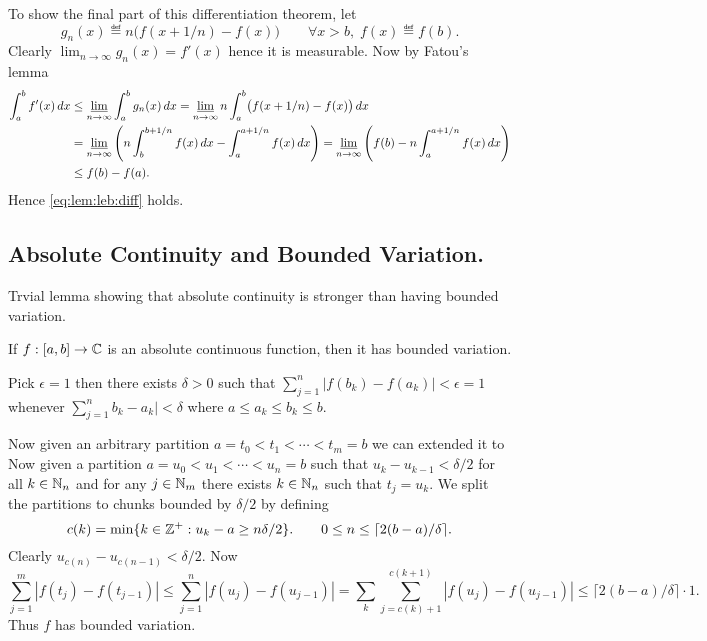 \begin{thmproof}
To show the final part of this differentiation theorem, let 
\begin{equation*}
g_n(x) \eqdef n\bigl(f(x+1/n) - f(x)\bigr) 
                        \qquad \forall x>b,\; f(x)\eqdef f(b).
\end{equation*}
Clearly \(\lim_{n\to\infty} g_n(x) = f'(x)\) hence it is measurable.
Now by Fatou's lemma
\begin{align*}
\int_a^b f'(x)\,dx
&\leq \varliminf_{n\to\infty} \int_a^b g_n(x)\,dx  
= \varliminf_{n\to\infty} n \int_a^b \bigl(f(x+1/n) - f(x)\bigr) \,dx  \\
&= \varliminf_{n\to\infty} 
   \left(n \int_b^{b+1/n} f(x)\,dx  - \int_a^{a+1/n} f(x)\,dx  \right)
 = \varliminf_{n\to\infty} 
   \left(f(b)  - n\int_a^{a+1/n} f(x)\,dx  \right) \\
& \leq f(b) - f(a).
\end{align*}
Hence \eqref{eq:lem:leb:diff} holds.
\end{thmproof}



\subsection{Absolute Continuity and Bounded Variation.}

Trvial lemma showing that absolute continuity is
stronger than having bounded variation.

\begin{llem}
If \(f:[a,b]\to\mathbb{C}\) is an absolute continuous function,
then it has bounded variation.
\end{llem}
\begin{thmproof}
Pick \(\epsilon=1\) then there exists \(\delta>0\)
such that 
\(\sum_{j=1}^n |f(b_k) - f(a_k)| < \epsilon=1\)
whenever
\(\sum_{j=1}^n b_k - a_k| < \delta\)
where \(a \leq a_k \leq b_k \leq b\).

Now given an arbitrary partition \(a = t_0 < t_1 < \cdots < t_m = b\)
we can extended it to 
Now given a partition \(a = u_0 < u_1 < \cdots < u_n = b\)
such that 
\(u_k - u_{k-1} < \delta/2\) for all \(k\in\mathbb{N}_n\) and 
for any \(j\in\mathbb{N}_m\) there exists \(k\in\mathbb{N}_n\) 
such that \(t_j = u_k\).
We split the partitions to chunks bounded by \(\delta/2\) by defining
\begin{equation*}
c(k) = \min \{k\in\mathbb{Z}^+: u_k - a \geq n\delta/2\}.
\qquad 0\leq n \leq \lceil 2(b-a)/\delta \rceil.
\end{equation*}
Clearly \(u_{c(n)} - u_{c(n-1)} < \delta/2\).
Now
\begin{equation*}
\sum_{j=1}^m |f(t_j) - f(t_{j-1})|
\leq \sum_{j=1}^n |f(u_j) - f(u_{j-1})|
= \sum_k \sum_{j=c(k) + 1}^{c(k+1)} |f(u_j) - f(u_{j-1})|
\leq \lceil 2(b-a)/\delta \rceil\cdot 1.
\end{equation*}
Thus $f$ has bounded variation.
\end{thmproof}



